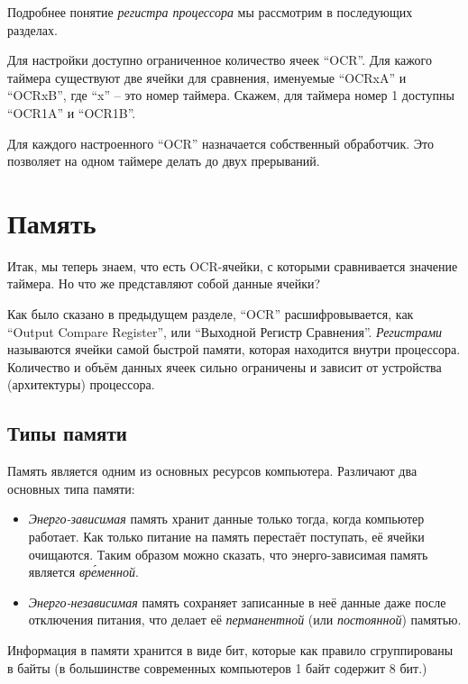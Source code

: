 \documentclass[../sparc.tex]{subfiles}
\begin{document}
Подробнее понятие \emph{регистра процессора} мы рассмотрим в последующих
разделах.

Для настройки доступно ограниченное количество ячеек ``OCR''.  Для кажого
таймера существуют две ячейки для сравнения, именуемые ``OCRxA'' и ``OCRxB'',
где ``x'' -- это номер таймера.  Скажем, для таймера номер 1 доступны ``OCR1A'' и
``OCR1B''.

Для каждого настроенного ``OCR'' назначается собственный обработчик.  Это
позволяет на одном таймере делать до двух прерываний.

\section{Память}

Итак, мы теперь знаем, что есть \gls{OCR}-ячейки, с которыми сравнивается
значение таймера.  Но что же представляют собой данные ячейки?

Как было сказано в предыдущем разделе, ``OCR'' расшифровывается, как ``Output
Compare Register'', или ``Выходной Регистр Сравнения''.  \emph{Регистрами}
называются ячейки самой быстрой памяти, которая находится внутри процессора.
Количество и объём данных ячеек сильно ограничены и зависит от устройства
(архитектуры) процессора.

\subsection{Типы памяти}

Память является одним из основных ресурсов компьютера.  Различают два основных
типа памяти:
\begin{itemize}
\item \emph{Энерго-зависимая} память хранит данные только тогда, когда компьютер
  работает.  Как только питание на память перестаёт поступать, её ячейки
  очищаются.  Таким образом можно сказать, что энерго-зависимая память является
  \emph{вр\'еменной}.
\item \emph{Энерго-независимая} память сохраняет записанные в неё данные даже
  после отключения питания, что делает её \emph{перманентной} (или
  \emph{постоянной}) памятью.
\end{itemize}

Информация в памяти хранится в виде бит, которые как правило сгруппированы в
байты (в большинстве современных компьютеров 1 байт содержит 8 бит.)
\end{document}
